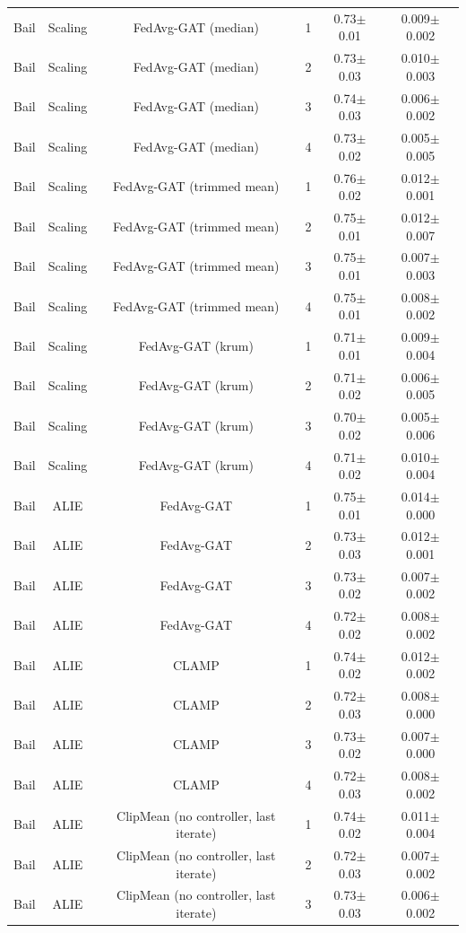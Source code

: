 \begin{table}[tbp]
\begin{tabular}{lccccc}
Bail & Scaling & FedAvg-GAT (median) & 1 & 0.73$\pm$0.01 & 0.009$\pm$0.002 \\
Bail & Scaling & FedAvg-GAT (median) & 2 & 0.73$\pm$0.03 & 0.010$\pm$0.003 \\
Bail & Scaling & FedAvg-GAT (median) & 3 & 0.74$\pm$0.03 & 0.006$\pm$0.002 \\
Bail & Scaling & FedAvg-GAT (median) & 4 & 0.73$\pm$0.02 & 0.005$\pm$0.005 \\
Bail & Scaling & FedAvg-GAT (trimmed mean) & 1 & 0.76$\pm$0.02 & 0.012$\pm$0.001 \\
Bail & Scaling & FedAvg-GAT (trimmed mean) & 2 & 0.75$\pm$0.01 & 0.012$\pm$0.007 \\
Bail & Scaling & FedAvg-GAT (trimmed mean) & 3 & 0.75$\pm$0.01 & 0.007$\pm$0.003 \\
Bail & Scaling & FedAvg-GAT (trimmed mean) & 4 & 0.75$\pm$0.01 & 0.008$\pm$0.002 \\
Bail & Scaling & FedAvg-GAT (krum) & 1 & 0.71$\pm$0.01 & 0.009$\pm$0.004 \\
Bail & Scaling & FedAvg-GAT (krum) & 2 & 0.71$\pm$0.02 & 0.006$\pm$0.005 \\
Bail & Scaling & FedAvg-GAT (krum) & 3 & 0.70$\pm$0.02 & 0.005$\pm$0.006 \\
Bail & Scaling & FedAvg-GAT (krum) & 4 & 0.71$\pm$0.02 & 0.010$\pm$0.004 \\
Bail & ALIE & FedAvg-GAT & 1 & 0.75$\pm$0.01 & 0.014$\pm$0.000 \\
Bail & ALIE & FedAvg-GAT & 2 & 0.73$\pm$0.03 & 0.012$\pm$0.001 \\
Bail & ALIE & FedAvg-GAT & 3 & 0.73$\pm$0.02 & 0.007$\pm$0.002 \\
Bail & ALIE & FedAvg-GAT & 4 & 0.72$\pm$0.02 & 0.008$\pm$0.002 \\
Bail & ALIE & CLAMP & 1 & 0.74$\pm$0.02 & 0.012$\pm$0.002 \\
Bail & ALIE & CLAMP & 2 & 0.72$\pm$0.03 & 0.008$\pm$0.000 \\
Bail & ALIE & CLAMP & 3 & 0.73$\pm$0.02 & 0.007$\pm$0.000 \\
Bail & ALIE & CLAMP & 4 & 0.72$\pm$0.03 & 0.008$\pm$0.002 \\
Bail & ALIE & ClipMean (no controller, last iterate) & 1 & 0.74$\pm$0.02 & 0.011$\pm$0.004 \\
Bail & ALIE & ClipMean (no controller, last iterate) & 2 & 0.72$\pm$0.03 & 0.007$\pm$0.002 \\
Bail & ALIE & ClipMean (no controller, last iterate) & 3 & 0.73$\pm$0.03 & 0.006$\pm$0.002 \\

\end{tabular}
\end{table}
